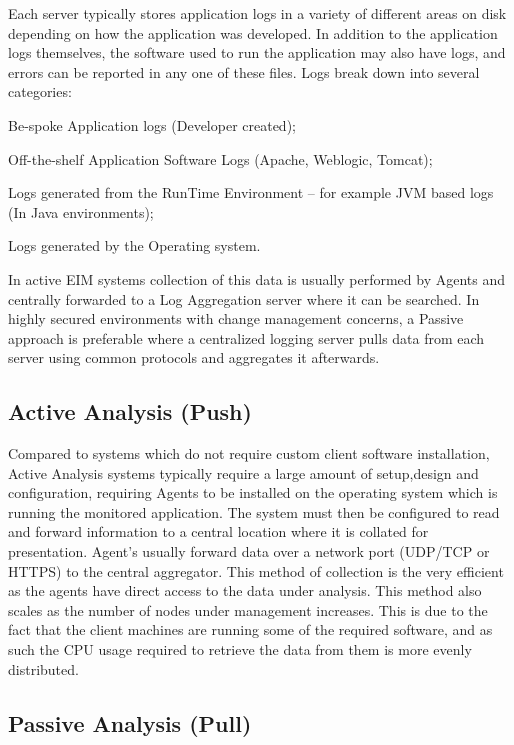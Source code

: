 \documentclass{llncs}
\begin{document}
Each server typically stores application logs in a variety of different areas on disk depending on how the application was developed. In addition to the application logs themselves, the software used to run the application may also have logs, and errors can be reported in any one of these files. Logs break down into several categories:

\begin{alpherate}
\item Be-spoke Application logs (Developer created);
\item Off-the-shelf Application Software Logs (Apache, Weblogic, Tomcat);
\item Logs generated from the RunTime Environment – for example JVM based logs (In Java environments);
\item Logs generated by the Operating system.
\end{alpherate}

In active EIM systems collection of this data is usually performed by Agents and centrally forwarded to a Log Aggregation server where it can be searched. In highly secured environments with change management concerns, a Passive approach is preferable where a centralized logging server pulls data from each server using common protocols and aggregates it afterwards.

\subsection{Active Analysis (Push)}

Compared to systems which do not require custom client software installation, Active Analysis systems typically require a large amount of setup,design and configuration, requiring Agents to be installed on the operating system which is running the monitored application. The system must then be configured to read and forward information to a central location where it is collated for presentation. Agent’s usually forward data over a network port (UDP/TCP or HTTPS) to the central aggregator. This method of collection is the very efficient as the agents have direct access to the data under analysis. This method also scales as the number of nodes under management increases. This is due to the fact that the client machines are running some of the required software, and as such the CPU usage required to retrieve the data from them is more evenly distributed.

\subsection{Passive Analysis (Pull)}
\end{document}
